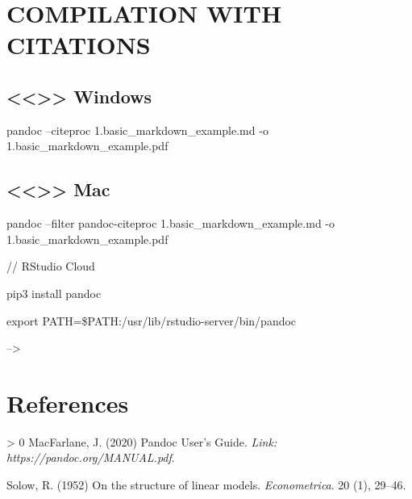 \documentclass[
]{article}
\newlength{\cslhangindent}
\newenvironment{CSLReferences}[3] %
 {%
  \setlength{\parindent}{0pt}
  \ifodd #1 \everypar{\setlength{\hangindent}{\cslhangindent}}\ignorespaces\fi
  \ifnum #2 > 0
  \setlength{\parskip}{#2\baselineskip}
  \fi
 }%
 {}
\begin{document}
\hypertarget{compilation-with-citations}{%
\section{COMPILATION WITH CITATIONS}\label{compilation-with-citations}}

\hypertarget{windows}{%
\subsection{\textless\textless\textgreater\textgreater{} Windows}\label{windows}}

pandoc --citeproc 1.basic\_markdown\_example.md -o 1.basic\_markdown\_example.pdf

\hypertarget{mac}{%
\subsection{\textless\textless\textgreater\textgreater{} Mac}\label{mac}}

pandoc --filter pandoc-citeproc 1.basic\_markdown\_example.md -o 1.basic\_markdown\_example.pdf

// RStudio Cloud

pip3 install pandoc

export PATH=\$PATH:/usr/lib/rstudio-server/bin/pandoc

--\textgreater{}

\hypertarget{references}{%
\section*{References}\label{references}}

\hypertarget{refs}{}
\begin{CSLReferences}{1}{0}
\leavevmode\hypertarget{ref-MacFarlane}{}%
MacFarlane, J. (2020) {Pandoc User's Guide}. \emph{Link: https://pandoc.org/MANUAL.pdf}.

\leavevmode\hypertarget{ref-solow1952structure}{}%
Solow, R. (1952) On the structure of linear models. \emph{Econometrica}. 20 (1), 29--46.

\end{CSLReferences}
\end{document}

